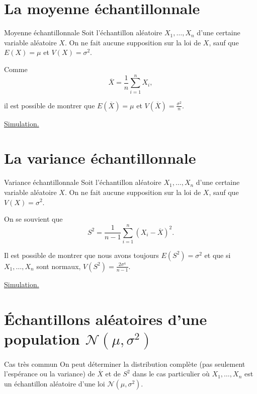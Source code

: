 \documentclass{BeamerTemplate}
\begin{document}
\section{La moyenne échantillonnale}
\begin{frame}[t]{Moyenne échantillonnale}
Soit l'échantillon aléatoire  $X_1,\hdots,X_n$ d'une certaine variable aléatoire $X$. 
On ne fait aucune supposition sur la loi de $X$, sauf que $E(X)=\mu$ et $V(X)=\sigma^2$.

Comme $$\overline{X}=\frac{1}{n}\sum_{i=1}^nX_i,$$

il est possible de montrer que $E(\overline{X})=\mu$ et $\displaystyle V(\overline{X})=\frac{\sigma^2}{n}$.

\vspace{0.5cm}
\vfill
    \href{https://019fb410-e0e6-81d3-48e5-52f2c8f6cbc5.share.connect.posit.cloud/}{Simulation.}
\end{frame}

\section{La variance échantillonnale}

\begin{frame}[t]{Variance échantillonnale}
Soit l'échantillon aléatoire  $X_1,\hdots,X_n$ d'une certaine variable aléatoire $X$. 
On ne fait aucune supposition sur la loi de $X$, sauf que $V(X)=\sigma^2$.

On se souvient que $$S^2=\frac{1}{n-1}\sum_{i=1}^n(X_i-\overline{X})^2.$$

Il est possible de montrer que nous avons toujours $E(S^2)=\sigma^2$ et que si $X_1,\hdots,X_n$ sont normaux, $\displaystyle V(S^2)=\frac{2\sigma^4}{n-1}$.

\vspace{1cm}
\href{https://019fb410-e0e6-81d3-48e5-52f2c8f6cbc5.share.connect.posit.cloud/}{Simulation.}

\end{frame}

\section{Échantillons aléatoires d'une population $\mathcal{N}(\mu,\sigma^2)$}

\begin{frame}[t]{Cas très commun}
    On peut déterminer la distribution complète (pas seulement l'espérance ou la variance) 
    de $\overline{X}$ et de $S^2$ dans le cas particulier où $X_1,\dots,X_n$ est un échantillon
    aléatoire d'une loi $\mathcal{N}(\mu,\sigma^2)$.
\end{frame}
\end{document}
